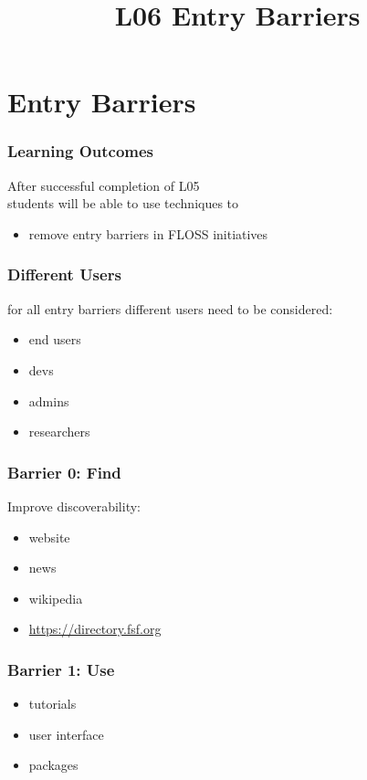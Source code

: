 

\title{L06 Entry Barriers}



\section{Entry Barriers}

\begin{frame}
	\frametitle{Learning Outcomes}
	After successful completion of L05 \\
	students will be able to
	use techniques to

	\begin{itemize}
	\item remove entry barriers in FLOSS initiatives
	\end{itemize}
\end{frame}

\begin{frame}
	\frametitle{Different Users}

	for all entry barriers different users need to be considered:

	\begin{itemize}[<+-| alert@+>]
	\item end users
	\item devs
	\item admins
	\item researchers
	\end{itemize}
\end{frame}

\begin{frame}
	\frametitle{Barrier 0: Find}
	
	Improve discoverability:

	\begin{itemize}[<+-| alert@+>]
	\item website
	\item news
	\item wikipedia
	\item \url{https://directory.fsf.org}
	\end{itemize}
\end{frame}

\begin{frame}
	\frametitle{Barrier 1: Use}

	\begin{itemize}[<+-| alert@+>]
	\item tutorials
	\item user interface
	\item packages
	\end{itemize}
\end{frame}

